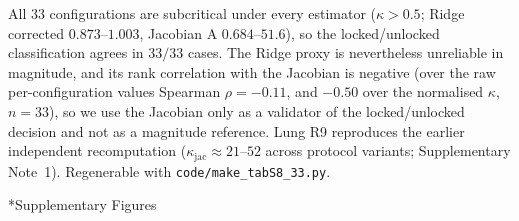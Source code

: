 \documentclass[11pt,a4paper]{article}
\makeatletter
\renewcommand{\section}{\@startsection{section}{1}{0pt}{12pt plus 6pt}{6pt}{\large\bfseries}}
\makeatother
\begin{document}
\begin{table}[ht]
\centering
\caption*{\textbf{Supplementary Table~S8.} Analytical-Jacobian re-audit of \textbf{all 33} configurations, every one of which has a checkpoint and iter$_4$ stagedata on disk. For each, the decoder trace was recomputed with the analytical decoder Jacobian (folded UNAGI ziln decoder, $(\mathrm{mean}_k\,\Jmat(\Zmat_k))^\top(\mathrm{mean}_k\,\Jmat(\Zmat_k))$, $N_K=1000$; variant~A differentiates the full mean chain, variant~B the linear head) alongside the Ridge readout. The \emph{trace} Ridge column is the value as published; the \emph{corrected} column is the predictability ratio $\sum_g R^2_g$, which is what the audit now reports. Tissues are h = hematopoietic, n = neural crest, l = lung fibrosis; $\mathrm{Jac.}\ C=(1-\kappa_{\mathrm{jac}})\times100\%$. The two estimators classify all 33 identically (0 locked; the body of the table is in the standalone \texttt{table\_s8\_jacobian\_audit.pdf}).}
\label{tab:s8_jacobian}
\footnotesize
\setlength{\tabcolsep}{3.5pt}

\vspace{4pt}

\footnotesize{All 33 configurations are subcritical under every estimator ($\kappa>0.5$; Ridge corrected $0.873$--$1.003$, Jacobian A $0.684$--$51.6$), so the locked/unlocked classification agrees in $33/33$ cases. The Ridge proxy is nevertheless unreliable in magnitude, and its rank correlation with the Jacobian is negative (over the raw per-configuration values Spearman $\rho=-0.11$, and $-0.50$ over the normalised $\kappa$, $n=33$), so we use the Jacobian only as a validator of the locked/unlocked decision and not as a magnitude reference. Lung R9 reproduces the earlier independent recomputation ($\kappa_{\mathrm{jac}}\approx21$--$52$ across protocol variants; Supplementary Note~1). Regenerable with \texttt{code/make\_tabS8\_33.py}.}
\end{table}


\section*{Supplementary Figures}
\end{document}
